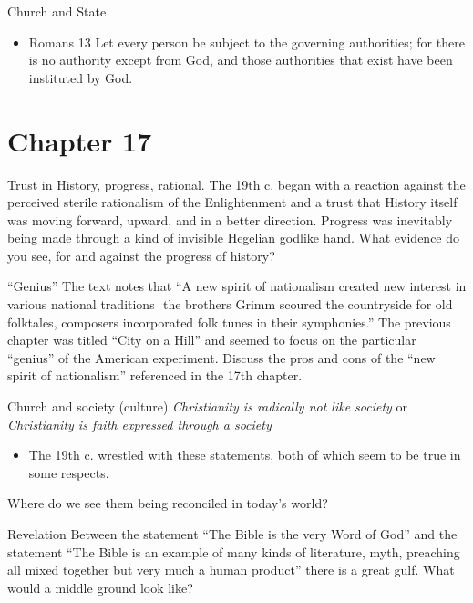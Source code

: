 \begin{frame}[label=sec-1-5]{Church and State}
\begin{itemize}
\item Romans 13 Let every person be subject to the governing authorities; for there is no authority except from God, and those authorities that exist have been instituted by God.
\end{itemize}
\end{frame}

\section{Chapter 17}
\label{sec-2}
\begin{frame}[label=sec-2-1]{Trust in History, progress, rational.}
The 19th c. began with a reaction against the perceived sterile rationalism of the
Enlightenment and a trust that History itself was moving forward, upward, and in a better
direction. Progress was inevitably being made through a kind of invisible Hegelian god­like
hand. What evidence do you see, for and against the progress of history?
\end{frame}

\begin{frame}[label=sec-2-2]{``Genius''}
The text notes that ``A new spirit of nationalism created new interest in various national
traditions ­­ the brothers Grimm scoured the countryside for old folktales, composers
incorporated folk tunes in their symphonies.'' The previous chapter was titled ``City on a Hill''
and seemed to focus on the particular ``genius'' of the American experiment. Discuss the
pros and cons of the ``new spirit of nationalism'' referenced in the 17th chapter.
\end{frame}

\begin{frame}[label=sec-2-3]{Church and society (culture)}
\emph{Christianity is radically not like society}
\alert{or}
\emph{Christianity is faith expressed through a society}

\begin{itemize}
\item The 19th c. wrestled with these statements, both of which seem to be true in some respects.
\end{itemize}
Where do we see them being reconciled in today's world?
\end{frame}

\begin{frame}[label=sec-2-4]{Revelation}
Between the statement ``The Bible is the very Word of God''
and the statement
``The Bible is an example of many kinds of literature, myth, preaching all mixed together but
very much a human product''
there is a great gulf.
What would a middle ground look like?
\end{frame}

